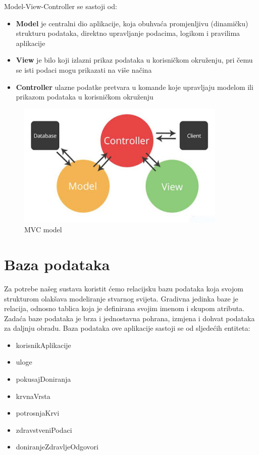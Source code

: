 	 {Model-View-Controller se sastoji od:}
	\begin{itemize}
		\item 	\textbf{Model} {je centralni dio aplikacije, koja obuhvaća promjenljivu (dinamičku) strukturu podataka, direktno upravljanje podacima, logikom i pravilima aplikacije}
		\item 	\textbf{View}{ je bilo koji izlazni prikaz podataka u korisničkom okruženju, pri čemu se isti podaci mogu prikazati na više načina}
		\item 	\textbf{Controller} {ulazne podatke pretvara u komande koje upravljaju modelom ili prikazom podataka u korisničkom okruženju}
	\end{itemize}
	
		\begin{figure}[H]
			\centering
			\includegraphics[width=100mm, scale=0.1]{slike/MVC.jpeg}
			\caption{MVC model}
			\label{fig:arhitektura}
		\end{figure}
\eject

		

				
		\section{Baza podataka}
			
			
			
		Za potrebe našeg sustava koristit ćemo relacijsku bazu podataka koja svojom strukturom olakšava modeliranje stvarnog svijeta. Gradivna jedinka baze je relacija, odnosno tablica koja je definirana svojim imenom i skupom atributa. Zadaća baze podataka je brza i jednostavna pohrana, izmjena i dohvat podataka za daljnju obradu.
Baza podataka ove aplikacije sastoji se od sljedećih entiteta: 
\begin{itemize}
		\item korisnikAplikacije
		\item uloge
		\item pokusajDoniranja
		\item krvnaVrsta
		\item potrosnjaKrvi
		\item zdravstveniPodaci
		\item doniranjeZdravljeOdgovori
		
	\end{itemize}


